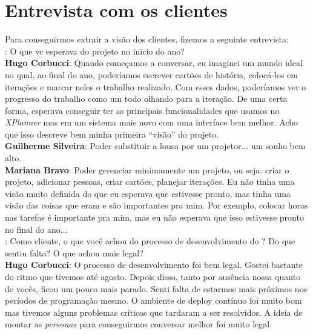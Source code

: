 \section{Entrevista com os clientes}

Para conseguirmos extrair a visão dos clientes, fizemos a seguinte entrevista:\\

\textbf{\calopsita{}}: O que vc esperava do projeto no inicio do ano?\\

\textbf{Hugo Corbucci}: Quando começamos a conversar, eu imaginei um mundo ideal no qual, ao final do ano, poderíamos escrever cartões de história, colocá-los em iterações e marcar neles o trabalho realizado. Com esses dados, poderíamos ver o progresso do trabalho como um todo olhando para a iteração. De uma certa forma, esperava conseguir ter as principais funcionalidades que usamos no \textit{XPlanner} mas em um sistema mais novo com uma interface bem melhor. Acho que isso descreve bem minha primeira ``visão'' do projeto.\\

\textbf{Guilherme Silveira}: Poder substituir a lousa por um projetor... um sonho bem alto.\\

\textbf{Mariana Bravo}: Poder gerenciar minimamente um projeto, ou seja: criar o projeto, adicionar pessoas, criar cartões, planejar iterações.
Eu não tinha uma visão muito definida do que eu esperava que estivesse pronto, mas tinha uma visão das coisas que eram e são importantes pra mim. Por exemplo, colocar horas nas tarefas é importante pra mim, mas eu não esperava que isso estivesse pronto no final do ano...\\

\textbf{\calopsita{}}: Como cliente, o que você achou do processo de desenvolvimento do \calopsita{}? Do que sentiu falta? O que achou mais legal?\\

\textbf{Hugo Corbucci}: O processo de desenvolvimento foi bem legal. Gostei bastante do ritmo que tivemos até agosto. Depois disso, tanto por ausência nossa quanto de vocês, ficou um pouco mais parado. Senti falta de estarmos mais próximos nos períodos de programação mesmo. O ambiente de deploy contínuo foi muito bom mas tivemos alguns problemas críticos que tardaram a ser resolvidos. A ideia de montar as \textit{personas} para conseguirmos conversar melhor foi muito legal.\\

